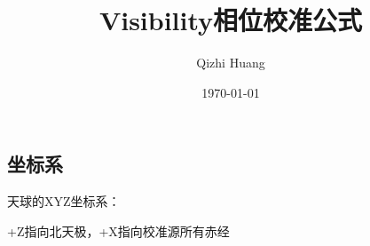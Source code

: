 \documentclass[11pt, a4paper]{article}  %
\begin{document}
\begin{CJK}{UTF8}{gbsn}  %
\nocite{*}
\setlength{\parskip}{6pt}  %
\setlength{\baselineskip}{20pt} %





\title{\huge Visibility相位校准公式 \bf }

\author{Qizhi Huang}
\date{\today}
\maketitle





\section{坐标系}

天球的XYZ坐标系：

\indent\indent +Z指向北天极，+X指向校准源所有赤经


\end{CJK}
\end{document}
